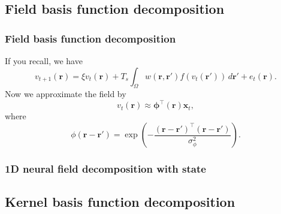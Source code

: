 \documentclass[compress]{beamer}
\begin{document}
\subsection[Field basis function decomposition]{Field basis function decomposition}

\begin{frame}\frametitle{Field basis function decomposition}
If you recall, we have
	$$ v_{t+1}\left(\mathbf{r}\right) = 
	\xi v_t\left(\mathbf{r}\right) + 
	T_s \int_\Omega { 
	    w\left(\mathbf{r},\mathbf{r}'\right)
	    f\left(v_t\left(\mathbf{r}'\right)\right) 
	\, d\mathbf{r}'} 
	+ e_t\left(\mathbf{r}\right). $$
Now we approximate the field by
\begin{equation}
		\label{DefFieldDecomp} v_t\left(\mathbf{r}\right) \approx \boldsymbol{\phi}^{\top}\left(\mathbf{r}\right) \mathbf{x}_t,
\end{equation}
where
$$ \phi\left(\mathbf{r}-\mathbf{r}'\right) =
\exp{\left(-\frac{(\mathbf{r}-\mathbf{r}')^\top(\mathbf{r}-\mathbf{r}')}{\sigma_{\phi}^2}\right)}. $$
\end{frame}

% 

\begin{frame} \frametitle{1D neural field decomposition with state}
\begin{center}	
\end{center}
\end{frame}

\subsection[Kernel basis function decomposition]{Kernel basis function decomposition}
\end{document}
